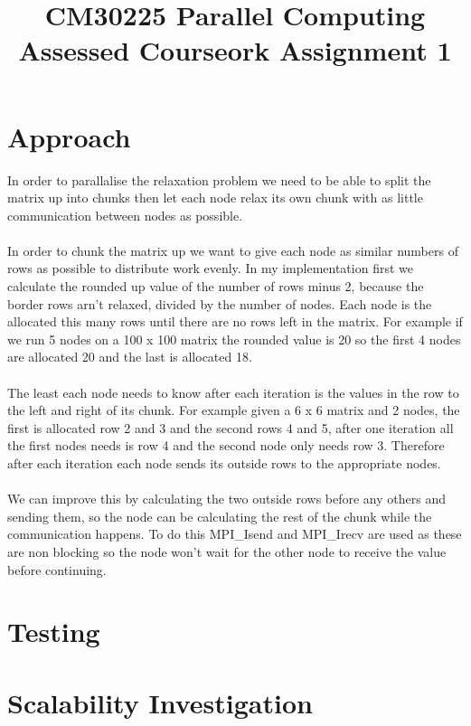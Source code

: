 \documentclass{article}
\begin{document}
\title{CM30225 Parallel Computing \\ Assessed Courseork Assignment 1}
\author{}

\maketitle

\section{Approach}

In order to parallalise the relaxation problem we need to be able to split the matrix
up into chunks then let each node relax its own chunk with as little communication
between nodes as possible.\\~\\
In order to chunk the matrix up we want to give each node as similar numbers of
rows as possible to distribute work evenly. In my implementation first we calculate
the rounded up value of the number of rows minus 2, because the border rows arn't relaxed,
divided by the number of nodes. Each node is the allocated this many rows until
there are no rows left in the matrix. For example if we run 5 nodes on a 100 x 100 matrix
the rounded value is 20 so the first 4 nodes are allocated 20 and the last is allocated
18.\\~\\
The least each node needs to know after each iteration is the values in the row
to the left and right of its chunk. For example given a 6 x 6 matrix and 2 nodes,
the first is allocated row 2 and 3 and the second rows 4 and 5, after one iteration
all the first nodes needs is row 4 and the second node only needs row 3. Therefore
after each iteration each node sends its outside rows to the appropriate nodes.\\~\\
We can improve this by calculating the two outside rows before any others and sending
them, so the node can be calculating the rest of the chunk while the communication
happens. To do this MPI\_Isend and MPI\_Irecv are used as these are non blocking
so the node won't wait for the other node to receive the value before continuing.

\section{Testing}


\section{Scalability Investigation}
\end{document}
